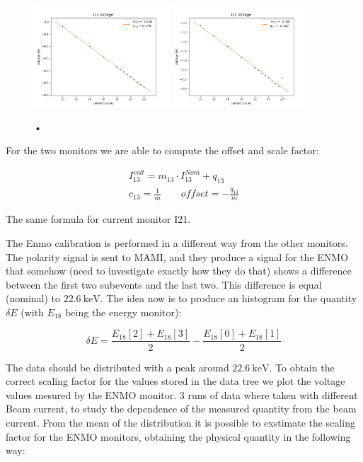 {\begin{figure}[hbtp]
\centering
\includegraphics[width = 0.45\textwidth]{Analysis/I13_Calibration.png}
\includegraphics[width = 0.45\textwidth]{Analysis/I21_Calibration.png} 
\caption{•}
\end{figure}

For the two monitors we are able to compute the offset and scale factor:

\begin{equation}
\begin{split}
I^{volt}_{13} = m_{13} \cdot I^{Nom}_{13} + q_{13}\\
c_{13} = \frac{1}{m} \qquad offset = -\frac{q_{13}}{m}
\end{split}
\end{equation}

The same formula for current monitor I21.

The Enmo calibration is performed in a different way from the other monitors. The polarity signal is sent to MAMI, and they produce a signal for the ENMO that somehow (need to investigate exactly how they do that) shows a difference between the first two subevents and the last two. This difference is equal (nominal) to $\SI{22.6}{\kilo \electronvolt}$. The idea now is to produce an histogram for the quantity $\delta E$ (with $E_{18}$ being the energy monitor):

\begin{equation*}
\delta E = \frac{E_{18}[2] + E_{18}[3]}{2} - \frac{E_{18}[0] + E_{18}[1]}{2} 
\end{equation*}

The data should be distributed with a peak around $\SI{22.6}{\kilo \electronvolt}$. To obtain the correct scaling factor for the values stored in the data tree we plot the voltage values mesured by the ENMO monitor.
3 runs of data where taken with different Beam current, to study the dependence of the measured quantity from the beam current. From the mean of the distribution it is possible to exstimate the scaling factor for the ENMO monitors, obtaining the physical quantity in the following way:

}
